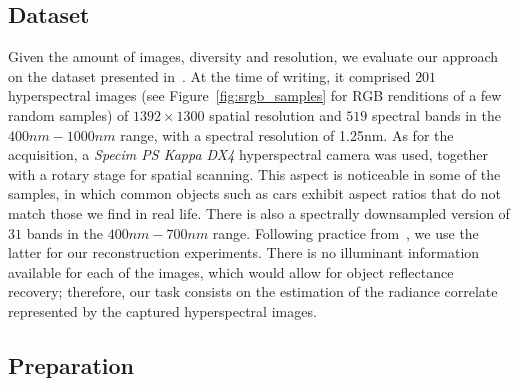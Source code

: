 \documentclass[10pt,twocolumn,letterpaper]{article}
\begin{document}
\subsection{Dataset}
Given the amount of images, diversity and resolution, we evaluate our approach on the dataset presented in~\cite{arad_sparse_2016}. At the time of writing, it comprised $201$ hyperspectral images (see Figure~\ref{fig:srgb_samples} for RGB renditions of a few random samples) of $1392\times1300$ spatial resolution and $519$ spectral bands in the $400nm-1000nm$ range, with a spectral resolution of 1.25nm. 
As for the acquisition, a \emph{Specim PS Kappa DX4} hyperspectral camera was used, together with a rotary stage for spatial scanning.
This aspect is noticeable in some of the samples, in which common objects such as cars exhibit aspect ratios that do not match those we find in real life. There is also a spectrally downsampled version of $31$ bands in the $400nm-700nm$ range. Following practice from~\cite{arad_sparse_2016}, we use the latter for our reconstruction experiments. There is no illuminant information available for each of the images, which would allow for object reflectance recovery; therefore, our task consists on the estimation of the radiance correlate represented by the captured hyperspectral images. 

\subsection{Preparation}
\label{ssec:preparation}
\end{document}
